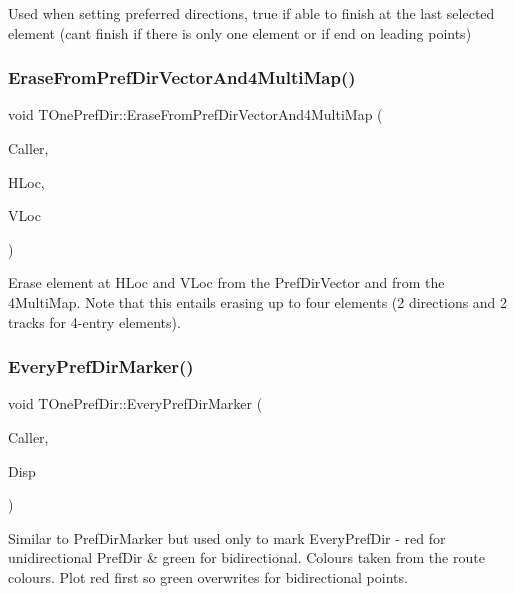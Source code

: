 Used when setting preferred directions, true if able to finish at the last selected element (can\textquotesingle{}t finish if there is only one element or if end on leading points) \mbox{\label{class_t_one_pref_dir_a8042c0e2fd7f9e39c3ca2a7bff7c68a4}} 
\subsubsection{\texorpdfstring{Erase\+From\+Pref\+Dir\+Vector\+And4\+Multi\+Map()}{EraseFromPrefDirVectorAnd4MultiMap()}}
{\footnotesize\ttfamily void T\+One\+Pref\+Dir\+::\+Erase\+From\+Pref\+Dir\+Vector\+And4\+Multi\+Map (\begin{DoxyParamCaption}\item[{int}]{Caller,  }\item[{int}]{H\+Loc,  }\item[{int}]{V\+Loc }\end{DoxyParamCaption})}

Erase element at H\+Loc and V\+Loc from the Pref\+Dir\+Vector and from the 4\+Multi\+Map. Note that this entails erasing up to four elements (2 directions and 2 tracks for 4-\/entry elements). \mbox{\label{class_t_one_pref_dir_a9b425a3ed8ef998e2366d13ad52bf08c}} 
\subsubsection{\texorpdfstring{Every\+Pref\+Dir\+Marker()}{EveryPrefDirMarker()}}
{\footnotesize\ttfamily void T\+One\+Pref\+Dir\+::\+Every\+Pref\+Dir\+Marker (\begin{DoxyParamCaption}\item[{int}]{Caller,  }\item[{\mbox{\hyperlink{class_t_display}{T\+Display}} $\ast$}]{Disp }\end{DoxyParamCaption})}

Similar to Pref\+Dir\+Marker but used only to mark Every\+Pref\+Dir -\/ red for unidirectional Pref\+Dir \& green for bidirectional. Colours taken from the route colours. Plot red first so green overwrites for bidirectional points. \mbox{\label{class_t_one_pref_dir_a06cd3491535362fccbba4e76b9a120e9}} 
